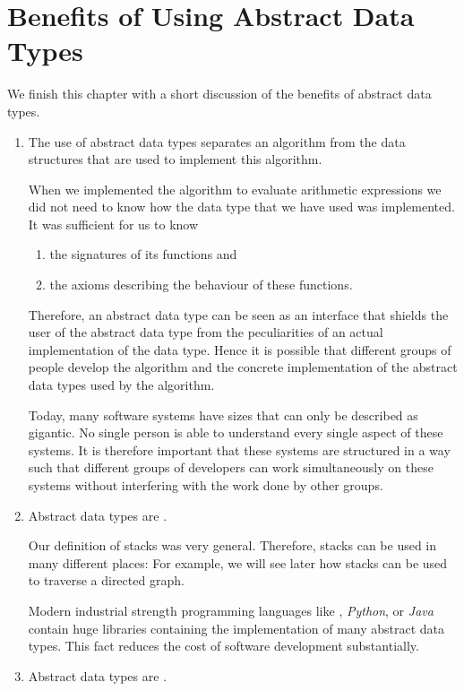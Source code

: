\section[Benefits of Abstract Data Types]{Benefits of Using Abstract Data Types}
We finish this chapter with a short discussion of the benefits of abstract data types.
 \begin{enumerate}
 \item The use of abstract data types separates an algorithm from the data structures that
       are used to implement this algorithm.

       When we implemented the algorithm to evaluate arithmetic expressions we did not need to know
       how the data type  that we have used was implemented.  It was sufficient for us to know 
       \begin{enumerate}
       \item the signatures of its functions and
       \item the axioms describing the behaviour of these functions.
       \end{enumerate}
       Therefore, an abstract data type can be seen as an interface that shields the user of the
       abstract data type from the peculiarities of an actual implementation of the data type.
       Hence it is possible that different groups of people develop the algorithm and the
       concrete implementation of the abstract data types used by the algorithm.  

       Today, many software systems have sizes that can only be described as gigantic.  No single
       person is able to understand every single aspect of these systems.  It is therefore important
       that these systems are structured in a way such that different groups of developers can work
       simultaneously on these systems without interfering with the work done by other groups.
 \item Abstract data types are .

       Our definition of stacks was very general.  Therefore, stacks can be used in many different
       places:  For example, we will see later how stacks can be used to traverse a directed graph.

       Modern industrial strength programming languages like , \textsl{Python}, or \textsl{Java} contain
       huge libraries containing the implementation of many abstract data types.  This fact reduces
       the cost of software development substantially.     
 \item Abstract data types are .


\end{enumerate}

